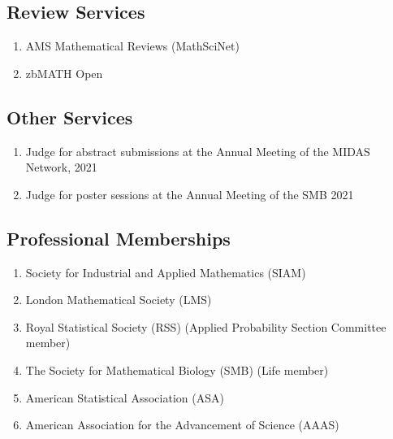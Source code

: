 \documentclass[11pt,a4paper,sans]{moderncv}        %
\begin{document}
\subsection{Review Services}
\begin{enumerate}
	\item AMS Mathematical Reviews (MathSciNet)
	\item zbMATH Open
\end{enumerate}

\subsection{Other Services}
\begin{enumerate}
	\item Judge for abstract submissions at the Annual Meeting of the MIDAS Network, 2021
	\item Judge for poster sessions at the Annual Meeting of the SMB 2021
\end{enumerate}

\subsection{Professional Memberships}
\begin{enumerate}
	\item {Society for Industrial and Applied Mathematics (SIAM)}
	\item London Mathematical Society (LMS)
	\item Royal Statistical Society (RSS) (Applied Probability Section Committee member)
	\item {The Society for Mathematical Biology (SMB)} (Life member)
	\item {American Statistical Association (ASA)}
	\item {American Association for the Advancement of Science (AAAS)}
\end{enumerate}



\end{document}
